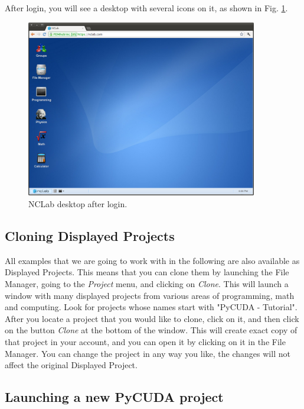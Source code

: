 \documentclass[article,A4,12pt]{llncs}
\begin{document}
\noindent
After login, you will see a desktop with several icons on it,
as shown in Fig. \ref{fig:desktop}. 

\begin{figure}[!ht]
\begin{center}
\includegraphics[width=0.9\textwidth]{img/desktop.png}
\end{center}
\caption{NCLab desktop after login.}
\label{fig:desktop}
\end{figure}

\subsection{Cloning Displayed Projects}

All examples that we are going to work with in the following are also available 
as Displayed Projects. This means that you can clone them by launching the File
Manager, going to the {\em Project} menu, and clicking on {\em Clone}. This will launch 
a window with many displayed projects from various areas of programming,
math and computing. Look for projects whose names start with "PyCUDA - Tutorial".
After you locate a project that you would like to clone, click on it,
and then click on the button {\em Clone} at the bottom of the window. This will
create exact copy of that project in your account, and you can open it 
by clicking on it in the File Manager. You can change the project in any way 
you like, the changes will not affect the original Displayed Project. 


\subsection{Launching a new PyCUDA project}
\end{document}
